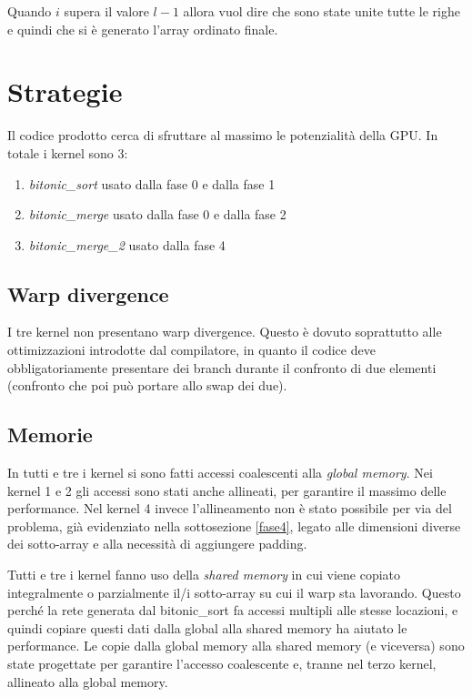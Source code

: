 \documentclass[a4paper, 11pt]{article}
\begin{document}
			Quando $i$ supera il valore $l-1$ allora vuol dire che sono state unite tutte le righe e quindi che si è
			generato l'array ordinato finale.
			
	\section{Strategie}
		\label{strategie}
		Il codice prodotto cerca di sfruttare al massimo le potenzialità della GPU.
		In totale i kernel sono 3:
		\begin{enumerate}
			\item \emph{bitonic\_sort} usato dalla fase 0 e dalla fase 1
			\item \emph{bitonic\_merge} usato dalla fase 0 e dalla fase 2
			\item \emph{bitonic\_merge\_2} usato dalla fase 4
		\end{enumerate}
		
		\subsection{Warp divergence}
			I tre kernel non presentano warp divergence. 
			Questo è dovuto soprattutto alle ottimizzazioni introdotte dal compilatore, in quanto
			il codice deve obbligatoriamente presentare dei branch durante il confronto di due elementi 
			(confronto che poi può portare allo swap dei due).
		
		\subsection{Memorie}
			In tutti e tre i kernel si sono fatti accessi coalescenti alla \emph{global memory}.
			Nei kernel 1 e 2 gli accessi sono stati anche allineati, per garantire il massimo delle performance. Nel kernel 4 
			invece l'allineamento non è stato possibile per via del problema, già evidenziato nella sottosezione \ref{fase4}, 
			legato alle dimensioni diverse dei sotto-array e alla necessità di aggiungere padding.
			
			Tutti e tre i kernel fanno uso della \emph{shared memory} in cui viene copiato integralmente o parzialmente 
			il/i sotto-array su cui il warp sta lavorando. Questo perché la rete generata dal bitonic\_sort fa accessi multipli 
			alle stesse locazioni, e quindi copiare questi dati dalla global alla shared memory ha aiutato le performance.
			Le copie dalla global memory alla shared memory (e viceversa) sono state progettate per garantire l'accesso coalescente e, tranne nel
			terzo kernel, allineato alla global memory. 
			
\end{document}
